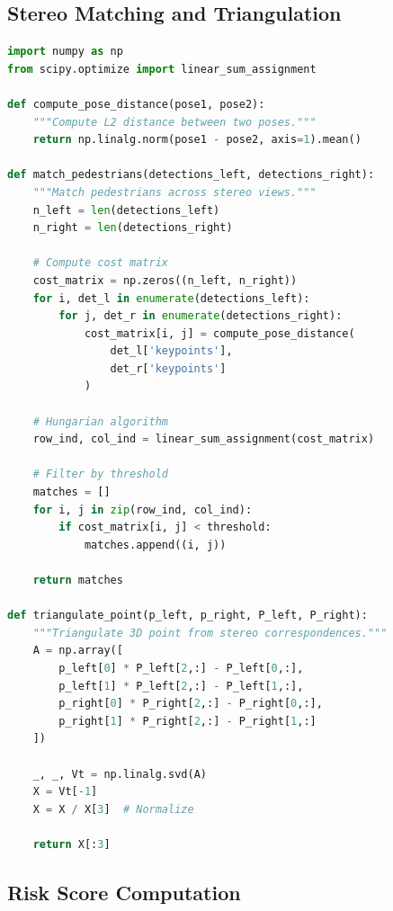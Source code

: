 \documentclass[11pt,a4paper]{article}
\begin{document}
\subsection{Stereo Matching and Triangulation}

\begin{lstlisting}[language=Python, caption=Stereo Matching Example]
import numpy as np
from scipy.optimize import linear_sum_assignment

def compute_pose_distance(pose1, pose2):
    """Compute L2 distance between two poses."""
    return np.linalg.norm(pose1 - pose2, axis=1).mean()

def match_pedestrians(detections_left, detections_right):
    """Match pedestrians across stereo views."""
    n_left = len(detections_left)
    n_right = len(detections_right)
    
    # Compute cost matrix
    cost_matrix = np.zeros((n_left, n_right))
    for i, det_l in enumerate(detections_left):
        for j, det_r in enumerate(detections_right):
            cost_matrix[i, j] = compute_pose_distance(
                det_l['keypoints'], 
                det_r['keypoints']
            )
    
    # Hungarian algorithm
    row_ind, col_ind = linear_sum_assignment(cost_matrix)
    
    # Filter by threshold
    matches = []
    for i, j in zip(row_ind, col_ind):
        if cost_matrix[i, j] < threshold:
            matches.append((i, j))
    
    return matches

def triangulate_point(p_left, p_right, P_left, P_right):
    """Triangulate 3D point from stereo correspondences."""
    A = np.array([
        p_left[0] * P_left[2,:] - P_left[0,:],
        p_left[1] * P_left[2,:] - P_left[1,:],
        p_right[0] * P_right[2,:] - P_right[0,:],
        p_right[1] * P_right[2,:] - P_right[1,:]
    ])
    
    _, _, Vt = np.linalg.svd(A)
    X = Vt[-1]
    X = X / X[3]  # Normalize
    
    return X[:3]
\end{lstlisting}

\subsection{Risk Score Computation}
\end{document}

